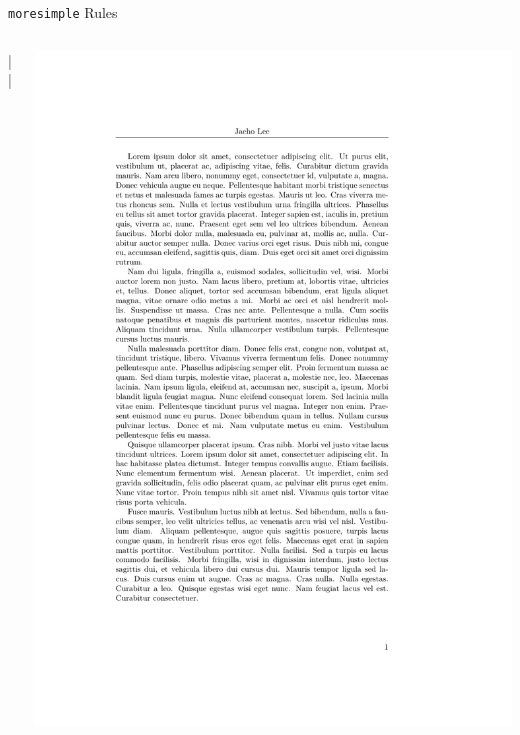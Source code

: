 \documentclass{beamer}
\begin{document}
\begin{frame}[fragile]{\texttt{moresimple} Rules}
  \begin{columns}
    \begin{column}{0.6\textwidth}
      \begin{latexcode}

        |\linebreak|{\color{WildStrawberry}}{}
      \end{latexcode}
    \end{column}

    \begin{column}{0.4\textwidth}
      \includegraphics[frame,width=\linewidth]{moresimple-rule}
    \end{column}
  \end{columns}
\end{frame}
\end{document}
